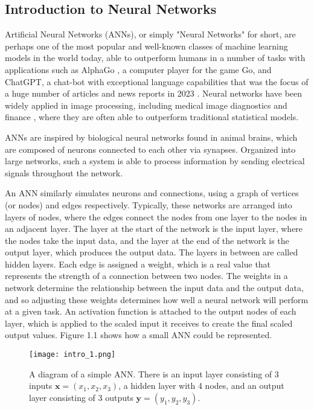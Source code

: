 \documentclass{somasmsc}
\begin{document}
\subsection{Introduction to Neural Networks}

Artificial Neural Networks (ANNs), or simply "Neural Networks" for short, are perhaps one of the most popular and well-known classes of machine learning models in the world today, able to outperform humans in a number of tasks with applications such as AlphaGo \citep{silver2016mastering}, a computer player for the game Go, and ChatGPT, a chat-bot with exceptional language capabilities that was the focus of a huge number of articles and news reports in 2023 \citep{ray2023chatgpt}. Neural networks have been widely applied \citep{sarker2021deep} in image processing, including medical image diagnostics \citep{jiang2010medical} and finance \citep{fadlalla2001analysis}, where they are often able to outperform traditional statistical models.

ANNs are inspired by biological neural networks found in animal brains, which are composed of neurons connected to each other via synapses. Organized into large networks, such a system is able to process information by sending electrical signals throughout the network.

An ANN similarly simulates neurons and connections, using a graph of vertices (or nodes) and edges respectively. Typically, these networks are arranged into layers of nodes, where the edges connect the nodes from one layer to the nodes in an adjacent layer. The layer at the start of the network is the input layer, where the nodes take the input data, and the layer at the end of the network is the output layer, which produces the output data. The layers in between are called hidden layers. Each edge is assigned a weight, which is a real value that represents the strength of a connection between two nodes. The weights in a network determine the relationship between the input data and the output data, and so adjusting these weights determines how well a neural network will perform at a given task. An activation function is attached to the output nodes of each layer, which is applied to the scaled input it receives to create the final scaled output values. Figure 1.1 shows how a small ANN could be represented.

\begin{figure}[H]
\begin{center}
\texttt{[image: intro\_1.png]}
\end{center}
\caption{A diagram of a simple ANN. There is an input layer consisting of 3 inputs $\pmb{x} = \left(x_1, x_2, x_3\right)$, a hidden layer with 4 nodes, and an output layer consisting of 3 outputs $\pmb{y} = \left(y_1, y_2, y_3\right)$.}
\end{figure}
\end{document}
